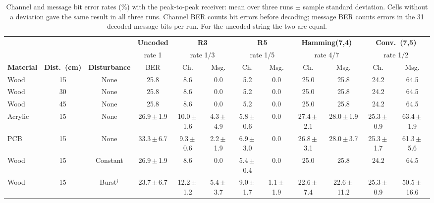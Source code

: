 \begin{table}[!t]
\centering
\caption{Channel and message bit error rates (\%) with the peak-to-peak receiver: mean over three runs $\pm$ sample standard deviation. Cells without a deviation gave the same result in all three runs. Channel BER counts bit errors before decoding; message BER counts errors in the 31 decoded message bits per run. For the uncoded string the two are equal.}
\label{tab:ber_codes}
\footnotesize
\setlength{\tabcolsep}{3pt}
\begin{tabular*}{\textwidth}{@{\extracolsep{\fill}}lcc c cc cc cc cc@{}}
\toprule
 & & & \textbf{Uncoded} & \multicolumn{2}{c}{\textbf{R3}} & \multicolumn{2}{c}{\textbf{R5}} & \multicolumn{2}{c}{\textbf{Hamming(7,4)}} & \multicolumn{2}{c}{\textbf{Conv.\ (7,5)}} \\
 & & & rate 1 & \multicolumn{2}{c}{rate 1/3} & \multicolumn{2}{c}{rate 1/5} & \multicolumn{2}{c}{rate 4/7} & \multicolumn{2}{c}{rate 1/2} \\
\cmidrule(lr){4-4}\cmidrule(lr){5-6}\cmidrule(lr){7-8}\cmidrule(lr){9-10}\cmidrule(lr){11-12}
\textbf{Material} & \textbf{Dist.\ (cm)} & \textbf{Disturbance} & BER & Ch. & Msg. & Ch. & Msg. & Ch. & Msg. & Ch. & Msg. \\
\midrule
Wood & 15 & None & 25.8 & 8.6 & 0.0 & 5.2 & 0.0 & 25.0 & 25.8 & 24.2 & 64.5 \\
Wood & 30 & None & 25.8 & 8.6 & 0.0 & 5.2 & 0.0 & 25.0 & 25.8 & 24.2 & 64.5 \\
Wood & 45 & None & 25.8 & 8.6 & 0.0 & 5.2 & 0.0 & 25.0 & 25.8 & 24.2 & 64.5 \\
Acrylic & 15 & None & 26.9{\scriptsize\,$\pm$\,1.9} & 10.0{\scriptsize\,$\pm$\,1.6} & 4.3{\scriptsize\,$\pm$\,4.9} & 5.8{\scriptsize\,$\pm$\,0.6} & 0.0 & 27.4{\scriptsize\,$\pm$\,2.1} & 28.0{\scriptsize\,$\pm$\,1.9} & 25.3{\scriptsize\,$\pm$\,0.9} & 63.4{\scriptsize\,$\pm$\,1.9} \\
PCB & 15 & None & 33.3{\scriptsize\,$\pm$\,6.7} & 9.3{\scriptsize\,$\pm$\,0.6} & 2.2{\scriptsize\,$\pm$\,1.9} & 6.9{\scriptsize\,$\pm$\,3.0} & 0.0 & 26.8{\scriptsize\,$\pm$\,3.1} & 28.0{\scriptsize\,$\pm$\,3.7} & 25.3{\scriptsize\,$\pm$\,1.7} & 61.3{\scriptsize\,$\pm$\,5.6} \\
Wood & 15 & Constant & 26.9{\scriptsize\,$\pm$\,1.9} & 8.6 & 0.0 & 5.4{\scriptsize\,$\pm$\,0.4} & 0.0 & 25.0 & 25.8 & 24.2 & 64.5 \\
Wood & 15 & Burst$^{\dagger}$ & 23.7{\scriptsize\,$\pm$\,6.7} & 12.2{\scriptsize\,$\pm$\,1.2} & 5.4{\scriptsize\,$\pm$\,3.7} & 9.0{\scriptsize\,$\pm$\,1.7} & 1.1{\scriptsize\,$\pm$\,1.9} & 22.6{\scriptsize\,$\pm$\,7.4} & 22.6{\scriptsize\,$\pm$\,11.2} & 25.3{\scriptsize\,$\pm$\,0.9} & 50.5{\scriptsize\,$\pm$\,16.6} \\

\end{tabular*}
\end{table}
